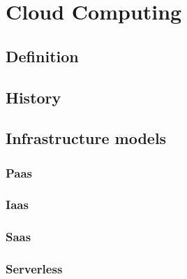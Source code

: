 \chapter{Cloud Computing}
\section{Definition}
\section{History}
\section{Infrastructure models}
\subsection{Paas}
\subsection{Iaas}
\subsection{Saas}
\subsection{Serverless}
